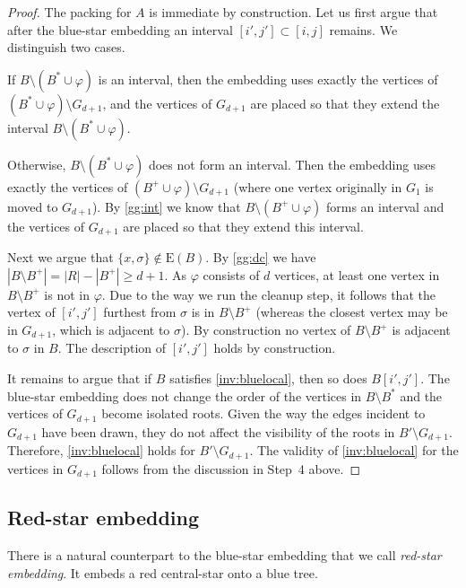\documentclass[11pt,a4paper,colorlinks=true,urlcolor=blue,citecolor=red]{article}
\theoremstyle{plain}
\newcommand{\EB}{\mathrm{E}(B)}
\begin{document}
\begin{proof}
  The packing for $A$ is immediate by construction. Let us first argue
  that after the blue-star embedding an interval $[i',j']\subset[i,j]$
  remains. We distinguish two cases.

  If $B\setminus(B^*\cup\varphi)$ is an interval, then the embedding
  uses exactly the vertices of $(B^*\cup\varphi)\setminus G_{d+1}$, and
  the vertices of $G_{d+1}$ are placed so that they extend the interval
  $B\setminus(B^*\cup\varphi)$.

  Otherwise, $B\setminus(B^*\cup\varphi)$ does not form an
  interval. Then the embedding uses exactly the vertices of
  $(B^+\cup\varphi)\setminus G_{d+1}$ (where one vertex originally in
  $G_1$ is moved to $G_{d+1}$). By \ref{gg:int} we know that
  $B\setminus(B^+\cup\varphi)$ forms an interval and the vertices of
  $G_{d+1}$ are placed so that they extend this interval.

  Next we argue that $\{x,\sigma\}\notin\EB$. By \ref{gg:dc}
  we have $|B\setminus B^+|=|R|-|B^+|\ge d+1$. As $\varphi$ consists of
  $d$ vertices, at least one vertex in $B\setminus B^+$ is not in
  $\varphi$. Due to the way we run the cleanup step, it follows that the
  vertex of $[i',j']$ furthest from $\sigma$ is in $B\setminus B^+$
  (whereas the closest vertex may be in $G_{d+1}$, which is adjacent to
  $\sigma$). By construction no vertex of $B\setminus B^+$ is adjacent
  to $\sigma$ in $B$. The description of $[i',j']$ holds by
  construction.

  It remains to argue that if $B$ satisfies \ref{inv:bluelocal}, then so
  does $B[i',j']$. The blue-star embedding does not change the order
  of the vertices in $B\setminus B^*$ and the vertices of $G_{d+1}$
  become isolated roots. Given the way the edges incident to $G_{d+1}$
  have been drawn, they do not affect the visibility of the roots in
  $B'\setminus G_{d+1}$.  Therefore, \ref{inv:bluelocal} holds for
  $B'\setminus G_{d+1}$. The validity of \ref{inv:bluelocal} for the
  vertices in $G_{d+1}$ follows from the discussion in Step~4 above.
\end{proof}

\subsection{Red-star embedding}
There is a natural counterpart to the blue-star embedding that we call
\emph{red-star embedding}. It embeds a red central-star onto a blue
tree.
\end{document}
